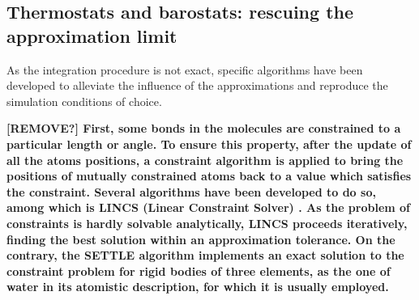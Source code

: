 
\subsection{Thermostats and barostats: rescuing the approximation limit}
As the integration procedure is not exact, specific algorithms have been developed to alleviate the influence of the approximations and reproduce the simulation conditions of choice.

\textbf{[REMOVE?] First, some bonds in the molecules are constrained to a particular length or angle. To ensure this property, after the update of all the atoms positions, a constraint algorithm is applied to bring the positions of mutually constrained atoms back to a value which satisfies the constraint. Several algorithms have been developed to do so, among which is LINCS (Linear Constraint Solver) \cite{Hess1997}. As the problem of constraints is hardly solvable analytically, LINCS proceeds iteratively, finding the best solution within an approximation tolerance. 
On the contrary, the SETTLE algorithm \cite{Miyamoto1992} implements an exact solution to the constraint problem for rigid bodies of three elements, as the one of water in its atomistic description, for which it is usually employed.}

